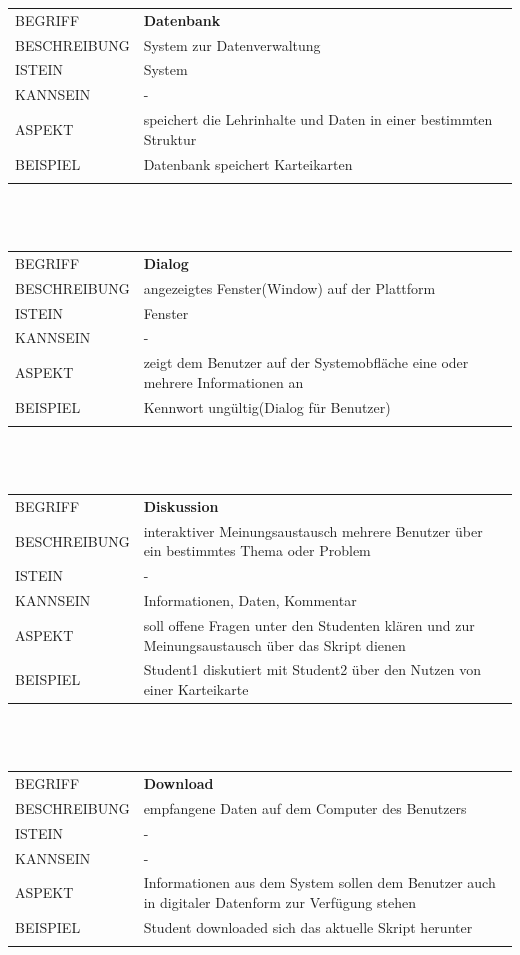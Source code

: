 \documentclass[12pt,a4paper]{article}
\begin{document}
\begin{tabular}{l p{12cm}}
BEGRIFF 	 & \textbf{Datenbank} \\ 
BESCHREIBUNG & System zur Datenverwaltung\\ 
ISTEIN   	 & System\\
KANNSEIN 	 & - \\ 
ASPEKT   	 & speichert die Lehrinhalte und Daten in einer bestimmten Struktur\\
BEISPIEL 	 & Datenbank speichert Karteikarten\\\\
\hline
\end{tabular}\\\\ 

\begin{tabular}{l p{12cm}}
BEGRIFF 	 & \textbf{Dialog} \\ 
BESCHREIBUNG & angezeigtes Fenster(Window) auf der Plattform\\ 
ISTEIN   	 & Fenster\\
KANNSEIN 	 & - \\ 
ASPEKT   	 & zeigt dem Benutzer auf der Systemobfläche eine oder mehrere Informationen an\\
BEISPIEL 	 & Kennwort ungültig(Dialog für Benutzer)\\\\
\hline
\end{tabular}\\\\  

\begin{tabular}{l p{12cm}}
BEGRIFF 	 & \textbf{Diskussion} \\ 
BESCHREIBUNG & interaktiver Meinungsaustausch mehrere Benutzer über ein bestimmtes Thema oder Problem\\ 
ISTEIN   	 & -\\
KANNSEIN 	 & Informationen, Daten, Kommentar\\ 
ASPEKT   	 & soll offene Fragen unter den Studenten klären und zur Meinungsaustausch über das Skript dienen \\
BEISPIEL 	 & Student1 diskutiert mit Student2 über den Nutzen von einer Karteikarte \\
\hline
\end{tabular}\\\\  

\begin{tabular}{l p{12cm}}
BEGRIFF 	 & \textbf{Download} \\ 
BESCHREIBUNG & empfangene Daten auf dem Computer des Benutzers\\ 
ISTEIN   	 & -\\
KANNSEIN 	 & -\\ 
ASPEKT   	 & Informationen aus dem System sollen dem Benutzer auch in digitaler Datenform zur Verfügung stehen\\
BEISPIEL 	 & Student downloaded sich das aktuelle Skript herunter\\\\
\hline
\end{tabular}\\\\  
\end{document}
